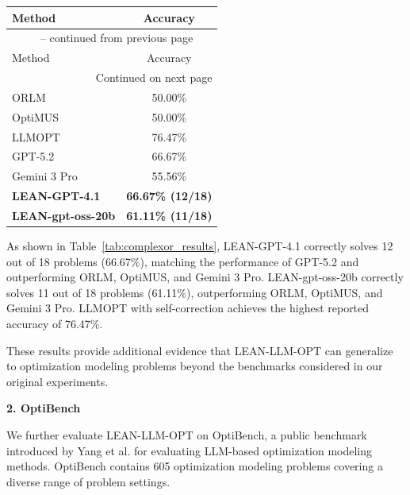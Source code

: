 \documentclass[11pt]{article}
\begin{document}
\begin{enumerate}[label=(R2.Major.\arabic*),leftmargin=*]
\begin{longtable}{lc}
\toprule
Method & Accuracy \\
\midrule
\endfirsthead

\multicolumn{2}{c}{
\tablename\ \thetable{} -- continued from previous page
} \\
\toprule
Method & Accuracy \\
\midrule
\endhead

\midrule
\multicolumn{2}{r}{Continued on next page} \\
\endfoot

\bottomrule
\endlastfoot

ORLM \citep{ding2026or}
& 50.00\% \\

OptiMUS \citep{zhang2026dual}
& 50.00\% \\

LLMOPT \citep{shu2025llmopt}
& 76.47\% \\

GPT-5.2 \citep{monteiro2026optiagent}
& 66.67\% \\

Gemini 3 Pro \citep{li2026constructing}
& 55.56\% \\

\midrule

\textbf{LEAN-GPT-4.1}
& \textbf{66.67\% (12/18)} \\

\textbf{LEAN-gpt-oss-20b}
& \textbf{61.11\% (11/18)} \\

\end{longtable}

As shown in Table~\ref{tab:complexor_results}, LEAN-GPT-4.1 correctly solves 12 out of 18 problems (66.67\%), matching the performance of GPT-5.2 and outperforming ORLM, OptiMUS, and Gemini 3 Pro. LEAN-gpt-oss-20b correctly solves 11 out of 18 problems (61.11\%), outperforming ORLM, OptiMUS, and Gemini 3 Pro. LLMOPT with self-correction achieves the highest reported accuracy of 76.47\%.

These results provide additional evidence that LEAN-LLM-OPT can generalize to optimization modeling problems beyond the benchmarks considered in our original experiments.

\medskip
\noindent
\textbf{2. OptiBench}

We further evaluate LEAN-LLM-OPT on OptiBench, a public benchmark introduced by Yang et al. \citep{yang2025optibench} for evaluating LLM-based optimization modeling methods. OptiBench contains 605 optimization modeling problems covering a diverse range of problem settings.


\end{enumerate}
\end{document}
